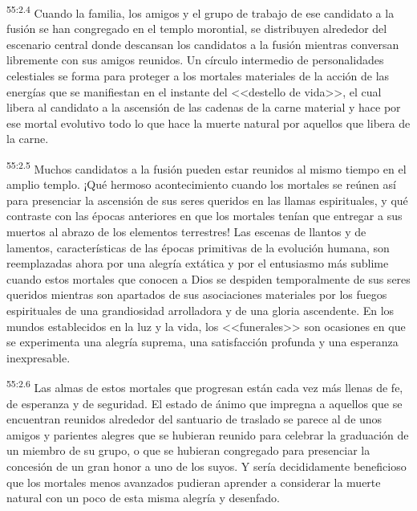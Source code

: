 \par
\textsuperscript{55:2.4} Cuando la familia, los amigos y el grupo de trabajo de ese candidato a la fusión se han congregado en el templo morontial, se distribuyen alrededor del escenario central donde descansan los candidatos a la fusión mientras conversan libremente con sus amigos reunidos. Un círculo intermedio de personalidades celestiales se forma para proteger a los mortales materiales de la acción de las energías que se manifiestan en el instante del <<destello de vida>>, el cual libera al candidato a la ascensión de las cadenas de la carne material y hace por ese mortal evolutivo todo lo que hace la muerte natural por aquellos que libera de la carne.

\par
\textsuperscript{55:2.5} Muchos candidatos a la fusión pueden estar reunidos al mismo tiempo en el amplio templo. ¡Qué hermoso acontecimiento cuando los mortales se reúnen así para presenciar la ascensión de sus seres queridos en las llamas espirituales, y qué contraste con las épocas anteriores en que los mortales tenían que entregar a sus muertos al abrazo de los elementos terrestres! Las escenas de llantos y de lamentos, características de las épocas primitivas de la evolución humana, son reemplazadas ahora por una alegría extática y por el entusiasmo más sublime cuando estos mortales que conocen a Dios se despiden temporalmente de sus seres queridos mientras son apartados de sus asociaciones materiales por los fuegos espirituales de una grandiosidad arrolladora y de una gloria ascendente. En los mundos establecidos en la luz y la vida, los <<funerales>> son ocasiones en que se experimenta una alegría suprema, una satisfacción profunda y una esperanza inexpresable.

\par
\textsuperscript{55:2.6} Las almas de estos mortales que progresan están cada vez más llenas de fe, de esperanza y de seguridad. El estado de ánimo que impregna a aquellos que se encuentran reunidos alrededor del santuario de traslado se parece al de unos amigos y parientes alegres que se hubieran reunido para celebrar la graduación de un miembro de su grupo, o que se hubieran congregado para presenciar la concesión de un gran honor a uno de los suyos. Y sería decididamente beneficioso que los mortales menos avanzados pudieran aprender a considerar la muerte natural con un poco de esta misma alegría y desenfado.


